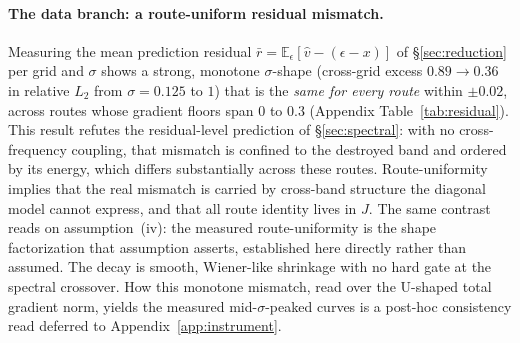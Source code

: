 \paragraph{The data branch: a route-uniform residual
mismatch.}
Measuring the mean prediction residual
$\bar r = \mathbb{E}_\epsilon[\hat v - (\epsilon - x)]$ of
\S\ref{sec:reduction} per grid and
$\sigma$ shows a strong,
monotone $\sigma$-shape (cross-grid excess $0.89 \to 0.36$ in
relative $L_2$ from $\sigma{=}0.125$ to $1$) that is the \emph{same
for every route} within $\pm 0.02$, across routes whose gradient
floors span $0$ to $0.3$ (Appendix Table~\ref{tab:residual}). This
result refutes the residual-level prediction of \S\ref{sec:spectral}:
with no cross-frequency coupling, that mismatch is confined to the
destroyed band and ordered by its energy, which differs substantially
across these routes. Route-uniformity implies that the real mismatch
is carried by cross-band structure the diagonal model cannot express,
and that all route identity lives in $J$. The same contrast reads on
assumption~(iv): the measured route-uniformity is the shape
factorization that assumption asserts, established here directly
rather than assumed. The
decay is smooth, Wiener-like shrinkage with no hard gate at the
spectral crossover. How this monotone mismatch, read over the
U-shaped total gradient norm, yields the measured mid-$\sigma$-peaked
curves is a post-hoc consistency read deferred to
Appendix~\ref{app:instrument}.


